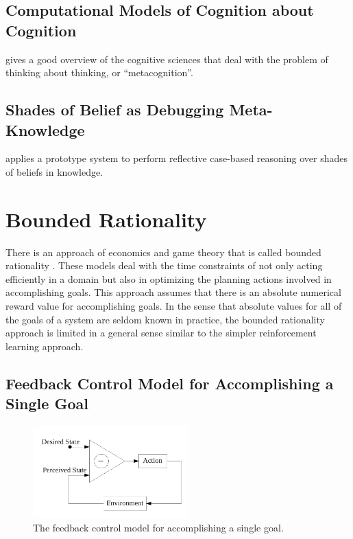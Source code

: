 \subsection{Computational Models of Cognition about Cognition}

\cite{cox:2005} gives a good overview of the cognitive sciences that
deal with the problem of thinking about thinking, or
``metacognition''.

\subsection{Shades of Belief as Debugging Meta-Knowledge}

\cite{stein:1995} applies a prototype system to perform reflective
case-based reasoning over shades of beliefs in knowledge.

\section{Bounded Rationality}

There is an approach of economics and game theory that is called
bounded rationality \citep{simon:1972}.  These models deal with the
time constraints of not only acting efficiently in a domain but also
in optimizing the planning actions involved in accomplishing goals.
This approach assumes that there is an absolute numerical reward value
for accomplishing goals.  In the sense that absolute values for all of
the goals of a system are seldom known in practice, the bounded
rationality approach is limited in a general sense similar to the
simpler reinforcement learning approach.

\subsection{Feedback Control Model for Accomplishing a Single Goal}

\begin{figure}[bth]
  \center
  \includegraphics[width=6cm]{gfx/feedback_control}
  \caption[The feedback control model for accomplishing a single goal]{The feedback control model for accomplishing a single goal.}
  \label{fig:feedback_control}
\end{figure}

